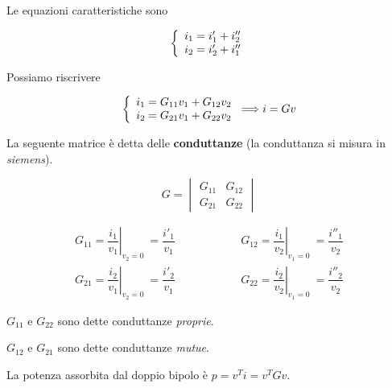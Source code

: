 \documentclass[a4paper]{report}
\begin{document}
Le equazioni caratteristiche sono

\[
\left\{
\begin{array}{l l}
  i_1=i'_1+i''_2\\
  i_2=i'_2+i''_1
\end{array}
\right.
\]

Possiamo riscrivere

\[
\left\{
\begin{array}{l l}
  i_1=G_{11}v_1+G_{12}v_2\\
  i_2=G_{21}v_1+G_{22}v_2
\end{array}
\right.\Longrightarrow i=Gv
\]

La seguente matrice \`e detta delle {\bf conduttanze} (la conduttanza
si misura in \emph{siemens}).

\[
G=
\begin{vmatrix}
  G_{11} & G_{12}\\
  G_{21} & G_{22}
\end{vmatrix}
\]

\vspace{0.5cm}

\[
\begin{matrix}
  G_{11}=\left. \dfrac{i_1}{v_1}\right|_{v_2=0} \ =\dfrac{i'_1}{v_1} &
  \quad \quad \quad \quad \quad
  G_{12}=\left. \dfrac{i_1}{v_2}\right|_{v_1=0} \ =\dfrac{i''_1}{v_2}\\[.5cm]
  G_{21}=\left. \dfrac{i_2}{v_1}\right|_{v_2=0} \ =\dfrac{i'_2}{v_1} &
  \quad \quad \quad \quad \quad
  G_{22}=\left. \dfrac{i_2}{v_2}\right|_{v_1=0} \ =\dfrac{i''_2}{v_2}
\end{matrix}
\]

\vspace{0.5cm}

$G_{11}$ e $G_{22}$ sono dette conduttanze \emph{proprie}.

$G_{12}$ e $G_{21}$ sono dette conduttanze \emph{mutue}.

La potenza assorbita dal doppio bipolo \`e $p=v^Ti=v^TGv$.
\end{document}
